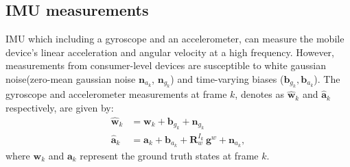 \subsection{IMU measurements} 
  IMU which including a gyroscope and an accelerometer, can measure the mobile device’s linear acceleration and angular velocity at a high frequency. However, measurements from consumer-level devices are susceptible to white gaussian noise(zero-mean gaussian noise ${\textbf{n}}_{a_k}$, ${\textbf{n}}_{g_k}$) and time-varying biases (${\textbf{b}}_{g_k}, {\textbf{b}}_{a_k}$). The gyroscope and accelerometer measurements at frame $k$, denotes as 
   ${\hat{\textbf{w}}}_{k}$ and ${\hat{\textbf{a}}}_{k}$ respectively, are given by:
  \begin{equation} 
    \begin{aligned}
      {\hat{\textbf{w}}}_{k} &= {\textbf{w}}_k + {\textbf{b}}_{g_k} + {\textbf{n}}_{g_k} \\
      {\hat{\textbf{a}}}_{k} &= {\textbf{a}}_k + {\textbf{b}}_{a_k} + {\textbf{R}}^{I_k}_{w}\,{\textbf{g}}^w + {\textbf{n}}_{a_k},
    \end{aligned}
  \end{equation}
  where ${\textbf{w}}_k$ and ${\textbf{a}}_k$ represent the ground truth states at frame $k$.
  
